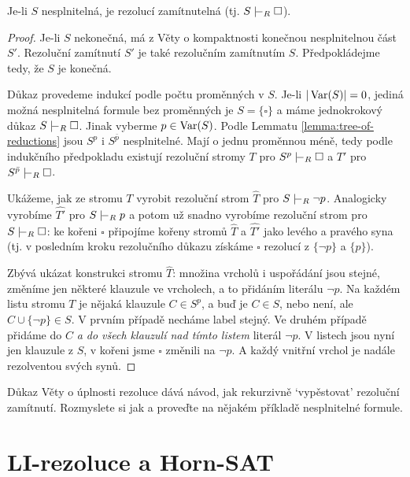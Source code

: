 \begin{theorem}
Je-li $S$ nesplnitelná, je rezolucí zamítnutelná (tj. $S\proves_R\square$).
\end{theorem}   
\begin{proof}
Je-li $S$ nekonečná, má z Věty o kompaktnosti konečnou nesplnitelnou část $S'$. Rezoluční zamítnutí $S'$ je také rezolučním zamítnutím $S$. Předpokládejme tedy, že $S$ je konečná. 

Důkaz provedeme indukcí podle počtu proměnných v $S$. Je-li $|\operatorname{Var}(S)|=0$, jediná možná nesplnitelná formule bez proměnných je $S=\{\square\}$ a máme jednokrokový důkaz $S\proves_R\square$. Jinak vyberme $p\in\operatorname{Var}(S)$. Podle Lemmatu \ref{lemma:tree-of-reductions} jsou $S^p$ i $S^{\bar p}$ nesplnitelné. Mají o jednu proměnnou méně, tedy podle indukčního předpokladu existují rezoluční stromy $T$ pro $S^p\proves_R\square$ a $T'$ pro $S^{\bar p}\proves_R\square$.

Ukážeme, jak ze stromu $T$ vyrobit rezoluční strom $\widehat T$ pro $S\proves_R \neg p$. Analogicky vyrobíme $\widehat{T'}$ pro $S\proves_R p$ a potom už snadno vyrobíme rezoluční strom pro $S\proves_R\square$: ke kořeni $\square$ připojíme kořeny stromů $\widehat T$ a $\widehat{T'}$ jako levého a pravého syna (tj. v posledním kroku rezolučního důkazu získáme $\square$ rezolucí z $\{\neg p\}$ a $\{p\}$).

Zbývá ukázat konstrukci stromu $\widehat T$: množina vrcholů i uspořádání jsou stejné, změníme jen některé klauzule ve vrcholech, a to přidáním literálu $\neg p$. Na každém listu stromu $T$ je nějaká klauzule $C\in S^p$, a buď je $C\in S$, nebo není, ale $C\cup\{\neg p\}\in S$. V prvním případě necháme label stejný. Ve druhém případě přidáme do $C$ \emph{a do všech klauzulí nad tímto listem} literál $\neg p$. V listech jsou nyní jen klauzule z $S$, v kořeni jsme $\square$ změnili na $\neg p$. A každý vnitřní vrchol je nadále rezolventou svých synů.
\end{proof}

\begin{exercise}
    Důkaz Věty o úplnosti rezoluce dává návod, jak rekurzivně `vypěstovat' rezoluční zamítnutí. Rozmyslete si jak a proveďte na nějakém příkladě nesplnitelné formule.
\end{exercise} %


\section{LI-rezoluce a Horn-SAT}

